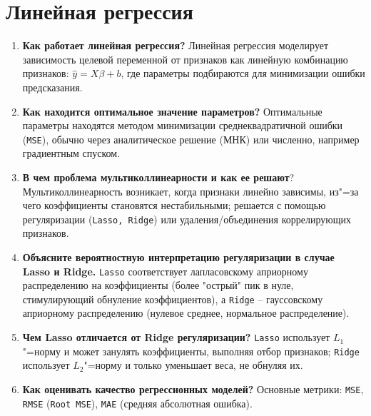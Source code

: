 \documentclass{article}
\begin{document}
\section{Линейная регрессия}
\begin{enumerate}
    \item \textbf{Как работает линейная регрессия?} Линейная регрессия моделирует зависимость целевой переменной от признаков как линейную комбинацию признаков: $\hat{y}
 = X\beta+b$, где параметры подбираются для минимизации ошибки предсказания.
    \item \textbf{Как находится оптимальное значение параметров?} Оптимальные параметры находятся методом минимизации среднеквадратичной ошибки (\texttt{MSE}), обычно через аналитическое решение (МНК) или численно, например градиентным спуском.
    \item \textbf{В чем проблема мультиколлинеарности и как ее решают}? Мультиколлинеарность возникает, когда признаки линейно зависимы, из"=за чего коэффициенты становятся нестабильными; решается с помощью регуляризации (\texttt{Lasso, Ridge}) или удаления/объединения коррелирующих признаков.
    \item \textbf{Объясните вероятностную интерпретацию регуляризации в случае Lasso и Ridge.} \texttt{Lasso} соответствует лапласовскому априорному распределению на коэффициенты (более "острый" пик в нуле, стимулирующий обнуление коэффициентов), а \texttt{Ridge} -- гауссовскому априорному распределению (нулевое среднее, нормальное распределение).
    \item \textbf{Чем Lasso отличается от Ridge регуляризации?} \texttt{Lasso} использует $L_1$"=норму и может занулять коэффициенты, выполняя отбор признаков; \texttt{Ridge} использует $L_2$"=норму и только уменьшает веса, не обнуляя их.
    \item \textbf{Как оценивать качество регрессионных моделей?} Основные метрики: \texttt{MSE}, \texttt{RMSE} (\texttt{Root MSE}), \texttt{MAE} (средняя абсолютная ошибка).
\end{enumerate}
\end{document}
